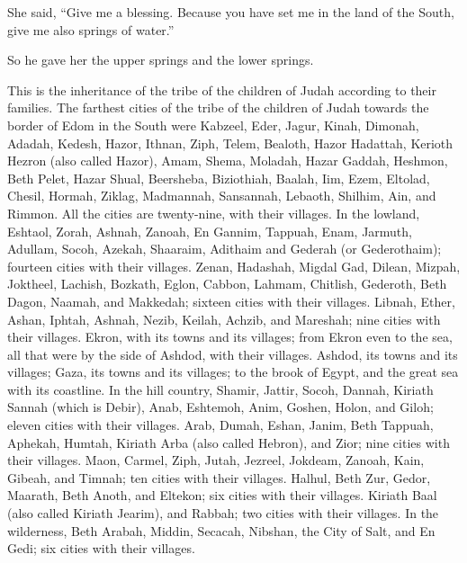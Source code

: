  She said, ``Give me a blessing. Because you have set me
in the land of the South, give me also springs of water.''

So he gave her the upper springs and the lower springs.

 This is the inheritance of the tribe of the children of
Judah according to their families.  The farthest cities
of the tribe of the children of Judah towards the border of Edom in the
South were Kabzeel, Eder, Jagur,  Kinah, Dimonah, Adadah,
 Kedesh, Hazor, Ithnan,  Ziph, Telem,
Bealoth,  Hazor Hadattah, Kerioth Hezron (also called
Hazor),  Amam, Shema, Moladah,  Hazar
Gaddah, Heshmon, Beth Pelet,  Hazar Shual, Beersheba,
Biziothiah,  Baalah, Iim, Ezem,  Eltolad,
Chesil, Hormah,  Ziklag, Madmannah, Sansannah,
 Lebaoth, Shilhim, Ain, and Rimmon. All the cities are
twenty-nine, with their villages.  In the lowland,
Eshtaol, Zorah, Ashnah,  Zanoah, En Gannim, Tappuah,
Enam,  Jarmuth, Adullam, Socoh, Azekah, 
Shaaraim, Adithaim and Gederah (or Gederothaim); fourteen cities with
their villages.  Zenan, Hadashah, Migdal Gad,
 Dilean, Mizpah, Joktheel,  Lachish,
Bozkath, Eglon,  Cabbon, Lahmam, Chitlish,
 Gederoth, Beth Dagon, Naamah, and Makkedah; sixteen
cities with their villages.  Libnah, Ether, Ashan,
 Iphtah, Ashnah, Nezib,  Keilah, Achzib,
and Mareshah; nine cities with their villages.  Ekron,
with its towns and its villages;  from Ekron even to the
sea, all that were by the side of Ashdod, with their villages.
 Ashdod, its towns and its villages; Gaza, its towns and
its villages; to the brook of Egypt, and the great sea with its
coastline.  In the hill country, Shamir, Jattir, Socoh,
 Dannah, Kiriath Sannah (which is Debir), 
Anab, Eshtemoh, Anim,  Goshen, Holon, and Giloh; eleven
cities with their villages.  Arab, Dumah, Eshan,
 Janim, Beth Tappuah, Aphekah,  Humtah,
Kiriath Arba (also called Hebron), and Zior; nine cities with their
villages.  Maon, Carmel, Ziph, Jutah, 
Jezreel, Jokdeam, Zanoah,  Kain, Gibeah, and Timnah; ten
cities with their villages.  Halhul, Beth Zur, Gedor,
 Maarath, Beth Anoth, and Eltekon; six cities with their
villages.  Kiriath Baal (also called Kiriath Jearim), and
Rabbah; two cities with their villages.  In the
wilderness, Beth Arabah, Middin, Secacah,  Nibshan, the
City of Salt, and En Gedi; six cities with their villages.

